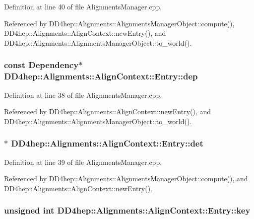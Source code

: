 Definition at line 40 of file AlignmentsManager.cpp.

Referenced by DD4hep::Alignments::AlignmentsManagerObject::compute(), DD4hep::Alignments::AlignContext::newEntry(), and DD4hep::Alignments::AlignmentsManagerObject::to\_\-world().\hypertarget{struct_d_d4hep_1_1_alignments_1_1_align_context_1_1_entry_a9e19872212429d2e48675c52c480aa35}{
\subsubsection[{dep}]{\setlength{\rightskip}{0pt plus 5cm}const {\bf Dependency}$\ast$ {\bf DD4hep::Alignments::AlignContext::Entry::dep}}}
\label{struct_d_d4hep_1_1_alignments_1_1_align_context_1_1_entry_a9e19872212429d2e48675c52c480aa35}


Definition at line 38 of file AlignmentsManager.cpp.

Referenced by DD4hep::Alignments::AlignContext::newEntry(), and DD4hep::Alignments::AlignmentsManagerObject::to\_\-world().\hypertarget{struct_d_d4hep_1_1_alignments_1_1_align_context_1_1_entry_a746553aaf4056ce6511a17c7929dde44}{
\subsubsection[{det}]{$\ast$ {\bf DD4hep::Alignments::AlignContext::Entry::det}}}
\label{struct_d_d4hep_1_1_alignments_1_1_align_context_1_1_entry_a746553aaf4056ce6511a17c7929dde44}


Definition at line 39 of file AlignmentsManager.cpp.

Referenced by DD4hep::Alignments::AlignmentsManagerObject::compute(), and DD4hep::Alignments::AlignContext::newEntry().\hypertarget{struct_d_d4hep_1_1_alignments_1_1_align_context_1_1_entry_a11ecca8923ec80803028766427ce25eb}{
\subsubsection[{key}]{\setlength{\rightskip}{0pt plus 5cm}unsigned int {\bf DD4hep::Alignments::AlignContext::Entry::key}}}
\label{struct_d_d4hep_1_1_alignments_1_1_align_context_1_1_entry_a11ecca8923ec80803028766427ce25eb}


